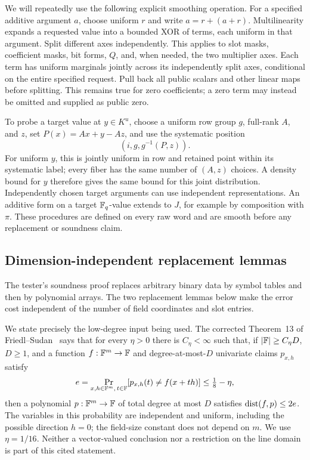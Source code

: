 We will repeatedly use the following explicit smoothing operation.
For a specified additive argument \(a\), choose uniform \(r\)
and write \(a=r+(a+r)\).  Multilinearity expands a requested value
into a bounded XOR of terms, each uniform in that argument.
Split different axes independently.  This applies to slot masks,
coefficient masks, bit forms, \(Q\), and, when needed, the two
multiplier axes.  Each term has uniform marginals jointly across
its independently split axes, conditional on the entire specified
request.  Pull back all public scalars and other linear maps before
splitting.  This remains true for zero coefficients; a zero term
may instead be omitted and supplied as public zero.

To probe a target value at \(y\in K^u\), choose a uniform row
group \(g\), full-rank \(A\), and \(z\), set
\(P(x)=Ax+y-Az\), and use the systematic position
\begin{equation}
 (i,g,g^{-1}(P,z)).
 \label{ib:systematic-probe}
\end{equation}
For uniform \(y\), this is jointly uniform in row and retained
point within its systematic label; every fiber has the same number
of \((A,z)\) choices.  A density bound for \(y\) therefore gives
the same bound for this joint distribution.  Independently chosen
target arguments can use independent representations.  An additive
form on a target \(\mathbb{F}_q\)-value extends to \(J\), for example by
composition with \(\pi\).  These procedures are defined on every
raw word and are smooth before any replacement or soundness claim.

\subsection{Dimension-independent replacement lemmas}
\label{ib:replacement-tools}

The tester's soundness proof replaces arbitrary binary data by symbol
tables and then by polynomial arrays. The two replacement lemmas below
make the error cost independent of the number of field coordinates and
slot entries.

We state precisely the low-degree input being used.  The corrected
Theorem~13 of Friedl--Sudan~\cite{FS1995} says that for every
\(\eta>0\) there is \(C_\eta<\infty\) such that, if
\(\lvert \mathbb{F}\rvert\ge C_\eta D\), \(D\ge1\), and a function
\(f:\mathbb{F}^m\to\mathbb{F}\) and degree-at-most-\(D\) univariate claims
\(p_{x,h}\) satisfy
\[
 e=\Pr_{x,h\in\mathbb{F}^m,\,t\in\mathbb{F}}
       [p_{x,h}(t)\ne f(x+th)]\le \tfrac18-\eta,
\]
then a polynomial \(p:\mathbb{F}^m\to\mathbb{F}\) of total degree at most \(D\)
satisfies \(\operatorname{dist}(f,p)\le2e\).  The variables in this probability
are independent and uniform, including the possible direction \(h=0\);
the field-size constant does not depend on \(m\).  We use
\(\eta=1/16\).  Neither a vector-valued conclusion nor a restriction
on the line domain is part of this cited statement.

